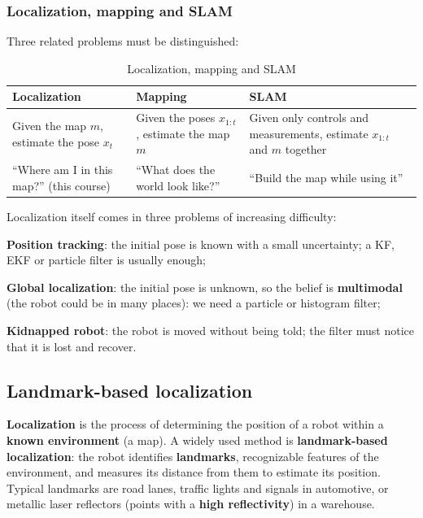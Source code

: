 \subsubsection{Localization, mapping and SLAM}
Three related problems must be distinguished:
\begin{table}[H]
    \centering
    \small
    \begin{tabular}{|p{4.6cm}|p{4.6cm}|p{4.6cm}|}
        \hline
        \textbf{Localization} & \textbf{Mapping} & \textbf{SLAM} \\
        \hline
        Given the map $m$, estimate the pose $x_t$ & Given the poses $x_{1:t}$, estimate the map $m$ & Given only controls and measurements, estimate $x_{1:t}$ and $m$ together \\
        \hline
        ``Where am I in this map?'' (this course) & ``What does the world look like?'' & ``Build the map while using it'' \\
        \hline
    \end{tabular}
    \caption{Localization, mapping and SLAM}
\end{table}

Localization itself comes in three problems of increasing difficulty:
\begin{compactitemize}
    \item \textbf{Position tracking}: the initial pose is known with a small uncertainty; a KF, EKF or particle filter is usually enough;
    \item \textbf{Global localization}: the initial pose is unknown, so the belief is \textbf{multimodal} (the robot could be in many places): we need a particle or histogram filter;
    \item \textbf{Kidnapped robot}: the robot is moved without being told; the filter must notice that it is lost and recover.
\end{compactitemize}

\subsection{Landmark-based localization}
\textbf{Localization} is the process of determining the position of a robot within a \textbf{known environment} (a map).
A widely used method is \textbf{landmark-based localization}: the robot identifies \textbf{landmarks}, recognizable features of the environment, and measures its distance from them to estimate its position.
Typical landmarks are road lanes, traffic lights and signals in automotive, or metallic laser reflectors (points with a \textbf{high reflectivity}) in a warehouse.


